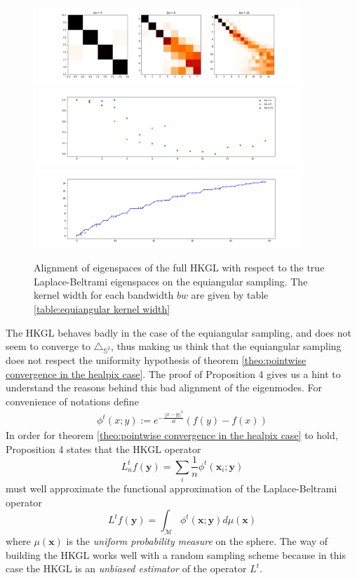 \begin{figure}[h!]
	\centering
	\includegraphics[width=0.9\textwidth]{../codes/02.HeatKernelGraphLaplacian/equiangular/equi_full.png}
	\includegraphics[width=0.9\textwidth]{../codes/02.HeatKernelGraphLaplacian/equiangular/equi_full_diagonal.png}
	\includegraphics[width=0.9\textwidth]{../codes/02.HeatKernelGraphLaplacian/equiangular/equi_full_eigenvalues_16.png}
	\caption{\label{fig:equiangular sampling alignment}Alignment of eigenspaces of the full HKGL with respect to the true Laplace-Beltrami eigenspaces on the equiangular sampling. The kernel width for each bandwidth $bw$ are given by table \ref{table:equiangular kernel width}}
\end{figure}
The HKGL behaves badly in the case of the equiangular sampling, and does not seem to converge to $\triangle_{\mathbb S^2}$, thus making us think that the equiangular sampling does not respect the uniformity hypothesis of theorem \ref{theo:pointwise convergence in the healpix case}. The proof of Proposition 4 gives us a hint to understand the reasons behind this bad alignment of the eigenmodes. For convenience of notations define 
\begin{align*}
	\phi^{t}(x ; y):=e^{-\frac{||x-y||^2}{4t}}\left(f(y)-f(x)\right)
\end{align*}
 In order for theorem \ref{theo:pointwise convergence in the healpix case} to hold, Proposition 4 states that the HKGL operator $$L_n^tf(\mathbf y)=\sum_i \frac{1}{n} \phi^{t}(\mathbf x_i ; \mathbf y)$$ must well approximate the functional approximation of the Laplace-Beltrami operator $$L^tf(\mathbf y)=\int_\mathcal M\phi^{t}(\mathbf x ; \mathbf y)d\mu(\mathbf x)$$
 where $\mu(\mathbf x)$ is the \textit{uniform probability measure} on the sphere.
The way of building the HKGL works well with a random sampling scheme because in this case the HKGL is an \textit{unbiased estimator} of the operator $L^t$.

